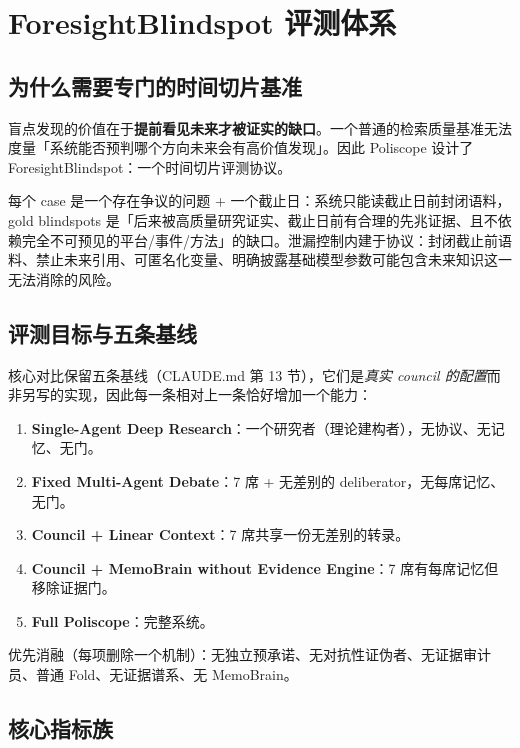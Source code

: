 \section{ForesightBlindspot 评测体系}

\subsection{为什么需要专门的时间切片基准}

盲点发现的价值在于\textbf{提前看见未来才被证实的缺口}。一个普通的检索质量基准无法度量「系统能否预判哪个方向未来会有高价值发现」。因此 Poliscope 设计了 ForesightBlindspot：一个时间切片评测协议。

每个 case 是一个存在争议的问题 + 一个截止日：系统只能读截止日前封闭语料，gold blindspots 是「后来被高质量研究证实、截止日前有合理的先兆证据、且不依赖完全不可预见的平台/事件/方法」的缺口。泄漏控制内建于协议：封闭截止前语料、禁止未来引用、可匿名化变量、明确披露基础模型参数可能包含未来知识这一无法消除的风险。

\subsection{评测目标与五条基线}

核心对比保留五条基线（CLAUDE.md 第 13 节），它们是\emph{真实 council 的配置}而非另写的实现，因此每一条相对上一条恰好增加一个能力：

\begin{enumerate}
\item \textbf{Single-Agent Deep Research}：一个研究者（理论建构者），无协议、无记忆、无门。
\item \textbf{Fixed Multi-Agent Debate}：7 席 + 无差别的 deliberator，无每席记忆、无门。
\item \textbf{Council + Linear Context}：7 席共享一份无差别的转录。
\item \textbf{Council + MemoBrain without Evidence Engine}：7 席有每席记忆但移除证据门。
\item \textbf{Full Poliscope}：完整系统。
\end{enumerate}

优先消融（每项删除一个机制）：无独立预承诺、无对抗性证伪者、无证据审计员、普通 Fold、无证据谱系、无 MemoBrain。

\subsection{核心指标族}

